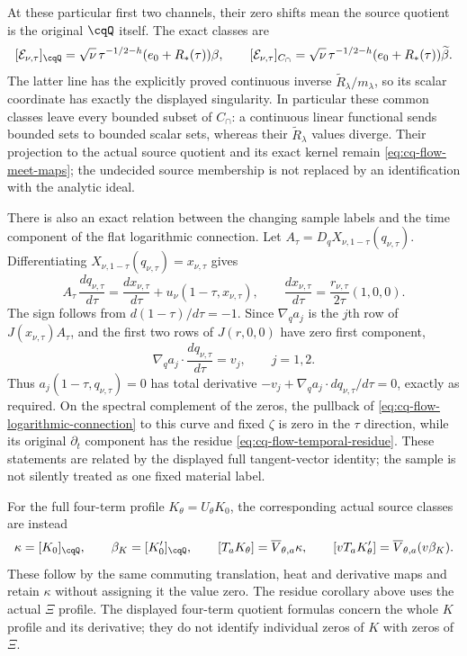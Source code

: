 At these particular first two channels, their zero shifts mean the
source quotient is the original $\cqQ$ itself. The exact classes are
\[
 [\mathcal E_{\nu,\tau}]_{\cqQ}
 =\sqrt\nu\,\tau^{-1/2-h}(e_0+R_*(\tau))\beta,\qquad
 [\mathcal E_{\nu,\tau}]_{C_\cap}
 =\sqrt\nu\,\tau^{-1/2-h}(e_0+R_*(\tau))\widetilde\beta.
\]
The latter line has the explicitly proved continuous inverse
$\widetilde R_\lambda/m_\lambda$, so its scalar coordinate has
exactly the displayed singularity. In particular these common
classes leave every bounded subset of $C_\cap$: a continuous linear
functional sends bounded sets to bounded scalar sets, whereas their
$\widetilde R_\lambda$ values diverge. Their projection to the
actual source quotient and its exact kernel remain
\eqref{eq:cq-flow-meet-maps}; the undecided source membership is
not replaced by an identification with the analytic ideal.

There is also an exact relation between the changing sample labels
and the time component of the flat logarithmic connection.
Let $A_\tau=D_qX_{\nu,1-\tau}(q_{\nu,\tau})$. Differentiating
$X_{\nu,1-\tau}(q_{\nu,\tau})=x_{\nu,\tau}$ gives
\[
 A_\tau\,\frac{dq_{\nu,\tau}}{d\tau}
 =\frac{dx_{\nu,\tau}}{d\tau}
       +u_\nu(1-\tau,x_{\nu,\tau}),\qquad
 \frac{dx_{\nu,\tau}}{d\tau}
       =\frac{r_{\nu,\tau}}{2\tau}(1,0,0).
\]
The sign follows from $d(1-\tau)/d\tau=-1$.
Since $\nabla_q a_j$ is the $j$th row of $J(x_{\nu,\tau})A_\tau$,
and the first two rows of $J(r,0,0)$ have zero first component,
\[
 \nabla_q a_j\cdot\frac{dq_{\nu,\tau}}{d\tau}=v_j,\qquad j=1,2.
\]
Thus $a_j(1-\tau,q_{\nu,\tau})=0$ has total derivative
$-v_j+\nabla_q a_j\cdot dq_{\nu,\tau}/d\tau=0$, exactly as required.
On the spectral complement of the zeros, the pullback of
\eqref{eq:cq-flow-logarithmic-connection} to this curve and fixed
$\zeta$ is zero in the $\tau$ direction, while its original
$\partial_t$ component has the residue
\eqref{eq:cq-flow-temporal-residue}. These statements are related
by the displayed full tangent-vector identity; the sample is not
silently treated as one fixed material label.

For the full four-term profile $K_\theta=U_\theta K_0$, the corresponding
actual source classes are instead
\[
 \kappa=[K_0]_{\cqQ},\qquad \beta_K=[K_0']_{\cqQ},\qquad
 [T_aK_\theta]=\overline V_{\theta,a}\kappa,\qquad
 [vT_aK_\theta']=\overline V_{\theta,a}(v\beta_K).
\]
These follow by the same commuting translation, heat and derivative
maps and retain $\kappa$ without assigning it the value zero.
The residue corollary above uses the actual $\Xi$ profile.
The displayed four-term quotient formulas concern the whole $K$
profile and its derivative; they do not identify individual zeros
of $K$ with zeros of $\Xi$.

